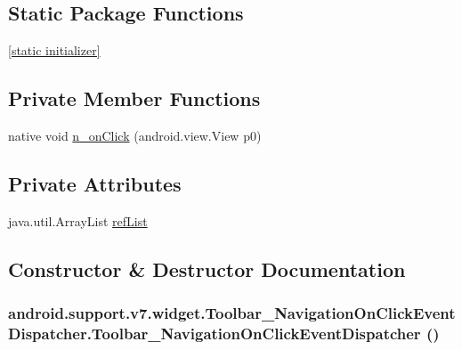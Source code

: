 \subsection*{Static Package Functions}
\begin{CompactItemize}
\item 
\hyperlink{classandroid_1_1support_1_1v7_1_1widget_1_1_toolbar___navigation_on_click_event_dispatcher_310ae30b2ede88dcee43e2a90315d87a}{\mbox{[}static initializer\mbox{]}}
\end{CompactItemize}
\subsection*{Private Member Functions}
\begin{CompactItemize}
\item 
native void \hyperlink{classandroid_1_1support_1_1v7_1_1widget_1_1_toolbar___navigation_on_click_event_dispatcher_81907100fd55a3ea604e5a426d458096}{n\_\-onClick} (android.view.View p0)
\end{CompactItemize}
\subsection*{Private Attributes}
\begin{CompactItemize}
\item 
java.util.ArrayList \hyperlink{classandroid_1_1support_1_1v7_1_1widget_1_1_toolbar___navigation_on_click_event_dispatcher_eef471eae53fd88b0923df3fdf2fecfa}{refList}
\end{CompactItemize}


\subsection{Constructor \& Destructor Documentation}
\hypertarget{classandroid_1_1support_1_1v7_1_1widget_1_1_toolbar___navigation_on_click_event_dispatcher_d096b2c7e8ad983ed031f9f22712fbdf}{
\subsubsection[{Toolbar\_\-NavigationOnClickEventDispatcher}]{\setlength{\rightskip}{0pt plus 5cm}android.support.v7.widget.Toolbar\_\-NavigationOnClickEventDispatcher.Toolbar\_\-NavigationOnClickEventDispatcher ()}}
\label{classandroid_1_1support_1_1v7_1_1widget_1_1_toolbar___navigation_on_click_event_dispatcher_d096b2c7e8ad983ed031f9f22712fbdf}


